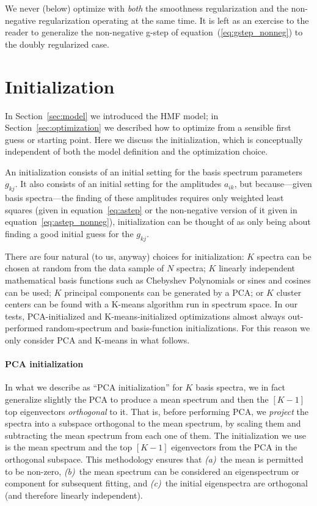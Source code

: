 \documentclass[12pt,preprint]{aastex}
\newcommand{\sectionname}{Section}
\newcommand{\equationname}{equation}
\begin{document}
We never (below) optimize with \emph{both} the smoothness
regularization and the non-negative regularization operating at the
same time.  It is left as an exercise to the reader to generalize the
non-negative g-step of \equationname~(\ref{eq:gstep_nonneg}) to the
doubly regularized case.

\section{Initialization}\label{sec:initialization}

In \sectionname~\ref{sec:model} we introduced the HMF model; in
\sectionname~\ref{sec:optimization} we described how to optimize from
a sensible first guess or starting point.  Here we discuss the
initialization, which is conceptually independent of both the model
definition and the optimization choice.

An initialization consists of an initial setting for the basis
spectrum parameters $g_{kj}$.  It also consists of an initial setting
for the amplitudes $a_{ik}$, but because---given basis spectra---the
finding of these amplitudes requires only weighted least squares
(given in \equationname~\ref{eq:astep} or the non-negative version of
it given in \equationname~\ref{eq:astep_nonneg}), initialization can
be thought of as only being about finding a good initial guess for the
$g_{kj}$.

There are four natural (to us, anyway) choices for initialization: $K$
spectra can be chosen at random from the data sample of $N$ spectra;
$K$ linearly independent mathematical basis functions such as
Chebyshev Polynomials or sines and cosines can be used; $K$ principal
components can be generated by a PCA; or $K$ cluster centers can be
found with a K-means algorithm run in spectrum space.  In our tests,
PCA-initialized and K-means-initialized optimizations almost always
out-performed random-spectrum and basis-function initializations.  For
this reason we only consider PCA and K-means in what follows.

\paragraph{PCA initialization}
In what we describe as ``PCA initialization'' for $K$ basis spectra,
we in fact generalize slightly the PCA to produce a mean spectrum and
then the $[K-1]$ top eigenvectors \emph{orthogonal} to it. 
That is, before performing PCA, we \emph{project} the spectra into a 
subspace orthogonal to the mean spectrum, by scaling them 
and subtracting the mean spectrum from each one of them.
The initialization we use is the mean spectrum
and the top $[K-1]$ eigenvectors from the PCA in the orthogonal
subspace.  This methodology ensures that \textsl{(a)}~the mean is permitted to be
non-zero, \textsl{(b)}~the mean spectrum can be considered an
eigenspectrum or component for subsequent fitting, and
\textsl{(c)}~the initial eigenspectra are orthogonal (and therefore
linearly independent).
\end{document}
